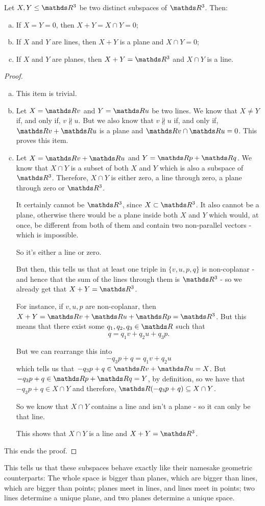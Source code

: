\begin{cor}
	Let $X,Y\leq \R^3$ be two distinct subspaces of $\R^3$. Then:
	\begin{enumerate}[a)]
		\item If $X=Y=0$, then $X+Y=X\cap Y=0$;
		\item If $X$ and $Y$ are lines, then $X+Y$ is a plane and $X\cap Y=0$;
		\item If $X$ and $Y$ are planes, then $X+Y=\R^3$ and $X\cap Y$ is a line.
	\end{enumerate}
\end{cor}
\begin{proof}
	\begin{enumerate}[a)]
		\item This item is trivial.
		
		\item Let $X=\R v$ and $Y=\R u$ be two lines. We know that $X\neq Y$ if, and only if, $v\nparallel u$. But we also know that $v\nparallel u$ if, and only if, $\R v+\R u$ is a plane and $\R v\cap\R u=0$. This proves this item.
		
		\item Let $X=\R v+\R u$ and $Y=\R p+\R q$. We know that $X\cap Y$ is a subset of both $X$ and $Y$ which is also a subspace of $\R^3$. Therefore, $X\cap Y$ is either zero, a line through zero, a plane through zero or $\R^3$.
		
		It certainly cannot be $\R^3$, since $X\subset\R^3$. It also cannot be a plane, otherwise there would be a plane inside both $X$ and $Y$ which would, at once, be different from both of them and contain two non-parallel vectors - which is impossible.
		
		So it's either a line or zero.
		
		But then, this tells us that at least one triple in $\{v,u,p,q\}$ is non-coplanar - and hence that the sum of the lines through them is $\R^3$ - so we already get that $X+Y=\R^3$.
		
		For instance, if $v,u,p$ are non-coplanar, then $X+Y=\R v+\R u+\R p=\R^3$. But this means that there exist some $q_1,q_2,q_3\in\R$ such that 
		\[q=q_1v+q_2u+q_3p.\]
		
		But we can rearrange this into
		\[-q_3p+q=q_1v+q_2u\]which tells us that $-q_3p+q\in \R v+\R u=X$. But $-q_3p+q\in\R p+\R q= Y$, by definition, so we have that $-q_3p+q\in X\cap Y$ and therefore, $\R (-q_3p+q)\subseteq X\cap Y$.
		
		So we know that $X\cap Y$ contains a line and isn't a plane - so it can only be that line.
		
		This shows that $X\cap Y$ is a line and $X+Y=\R^3$.
	\end{enumerate}

This ends the proof.
\end{proof}
\begin{rmk}
	This tells us that these subspaces behave exactly like their namesake geometric counterparts: The whole space is bigger than planes, which are bigger than lines, which are bigger than points; planes meet in lines, and lines meet in points; two lines determine a unique plane, and two planes determine a unique space.
\end{rmk}

